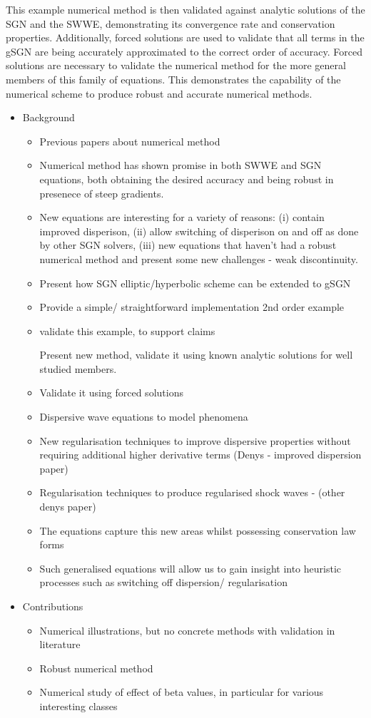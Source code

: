 \documentclass[10pt]{elsarticle}
\begin{document}
This example numerical method is then validated against analytic solutions of the SGN and the SWWE, demonstrating its convergence rate and conservation properties. Additionally, forced solutions are used to validate that all terms in the gSGN are being accurately approximated to the correct order of accuracy. Forced solutions are necessary to validate the numerical method for the more general members of this family of equations. This demonstrates the capability of the numerical scheme to produce robust and accurate numerical methods. 


\begin{itemize}
	\item Background
	\begin{itemize}
		\item Previous papers about numerical method
		\item Numerical method has shown promise in both SWWE and SGN equations, both obtaining the desired accuracy and being robust in presenece of steep gradients.
		\item New equations are interesting for a variety of reasons: (i) contain improved disperison, (ii) allow switching of disperison on and off as done by other SGN solvers, (iii) new equations that haven't had a robust numerical method and present some new challenges - weak discontinuity.
		\item Present how SGN elliptic/hyperbolic scheme can be extended to gSGN
		\item Provide a simple/ straightforward implementation 2nd order example
		\item validate this example, to support claims
		
		Present new method, validate it using known analytic solutions for well studied members.
		\item Validate it using forced solutions
		
		\item Dispersive wave equations to model phenomena
		\item New regularisation techniques to improve dispersive properties without requiring additional higher derivative terms (Denys - improved dispersion paper)
		\item Regularisation techniques to produce regularised shock waves - (other denys paper)
		\item The equations capture this new areas whilst possessing conservation law forms
		\item Such generalised equations will allow us to gain insight into heuristic processes such as switching off dispersion/ regularisation
	\end{itemize}
\item Contributions
\begin{itemize}
	\item Numerical illustrations, but no concrete methods with validation in literature
	\item Robust numerical method
	\item Numerical study of effect of beta values, in particular for various interesting classes
\end{itemize}
\end{itemize}
\end{document}
